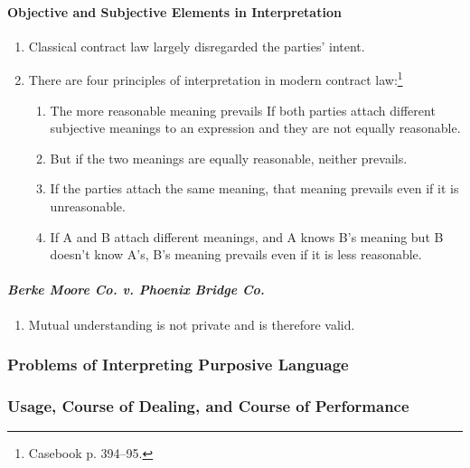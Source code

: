 \paragraph{Objective and Subjective Elements in Interpretation}

\begin{enumerate}
    \item Classical contract law largely disregarded the parties' intent.
    \item There are four principles of interpretation in modern contract 
    law:\footnote{Casebook p. 394--95.}
    \begin{enumerate}
        \item The more reasonable meaning prevails If both parties attach 
        different subjective meanings to an expression  and they 
        are not equally reasonable.
        \item But if the two meanings are equally reasonable, neither 
        prevails.
        \item If the parties attach the same meaning, that meaning prevails 
        even if it is unreasonable.
        \item If A and B attach different meanings, and A knows B's meaning 
        but B doesn't know A's, B's meaning prevails even if it is less 
        reasonable.
    \end{enumerate}
\end{enumerate}

\paragraph{\emph{Berke Moore Co. v. Phoenix Bridge Co.}}

\begin{enumerate}
    \item Mutual understanding is not private and is therefore valid.
\end{enumerate}

\subsubsection{Problems of Interpreting Purposive Language}


\subsubsection{Usage, Course of Dealing, and Course of Performance}

